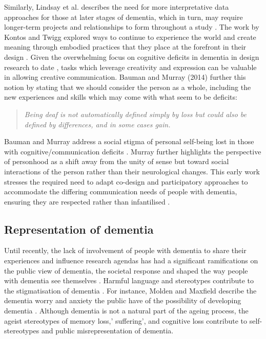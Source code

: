Similarly, Lindsay et al. describes the need for more interpretative data approaches for those at later stages of dementia, which in turn, may require longer-term projects and relationships to form throughout a study \citep{lindsay_empathy_2012}. The work by Kontos and Twigg explored ways to continue to experience the world and create meaning through embodied practices that they place at the forefront in their design \citep{twigg_dress_2013,kontos_expressions_2007}.  Given the overwhelming focus on cognitive deficits in dementia in design research to date \citep{lazar_critical_2017}, tasks which leverage creativity and expression can be valuable in allowing creative communication. Bauman and Murray (2014) further this notion by stating that we should consider the person as a whole, including the new experiences and skills which may come with what seem to be deficits:

\begin{quote}
\textit{    Being deaf is not automatically defined simply by loss but could also be defined by differences, and in some cases gain. \citep{bauman_l._&_murray_deaf_2014} 
}\end{quote}

Bauman and Murray address a social stigma of personal self-being lost in those with cognitive/communication deficits \citep{bauman_l._&_murray_deaf_2014}. Murray further highlights the perspective of personhood as a shift away from the unity of sense but toward social interactions of the person rather than their neurological changes. This early work stresses the required need to adapt co-design and participatory approaches to accommodate the differing communication needs of people with dementia, ensuring they are respected rather than infantilised \citep{salari_social_2001,john_killick_claire_craig_creativity_2012,vines_configuring_2013}.

\subsection{Representation of dementia}
\label{BL:RepresentationofDementia}
Until recently, the lack of involvement of people with dementia to share their experiences and influence research agendas has had a significant ramifications on the public view of dementia, the societal response and shaped the way people with dementia see themselves \citep{swaffer_dementia_2014}. Harmful language and stereotypes contribute to the stigmatisation of dementia \citep{reynolds2017stigma}. For instance, Molden and Maxfield describe the dementia worry and anxiety the public have of the possibility of developing dementia \citep{molden2017impact}. Although dementia is not a natural part of the ageing process, the ageist stereotypes of memory loss,' suffering', and cognitive loss contribute to self-stereotypes and public misrepresentation of dementia. 

